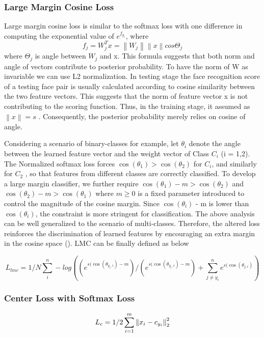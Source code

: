 \documentclass[a4paper,12pt, twoside]{NITKReport}
\begin{document}
\subsubsection{Large Margin Cosine Loss}
Large margin cosine loss is similar to the softmax loss with one difference in computing the exponential value of $e^{f_{y_{i}}}$, where 
\begin{equation}
{f_{j}}=W_{j}^{T} x = \left \| W_{j} \right \|\left \| x \right \|cos\Theta _{j}
\end{equation}
where $\Theta _{j}$ is angle between $W_{j}$ and x. This formula suggests that both norm and angle of vectors contribute to posterior probability. To have the norm of W as invariable we can use L2 normalization. In testing stage the face recognition score of a testing face pair is usually calculated according to cosine similarity between the two feature vectors.  This suggests that the norm of feature vector x is not  contributing to the scoring function.  Thus, in the training stage, it assumed as $\left \| x \right \| =s$ . Consequently, the posterior probability merely relies on cosine of angle.

Considering  a  scenario  of  binary-classes  for  example, let $\theta _{i}$ denote the angle between the learned feature vector and  the  weight  vector  of  Class $C_{i}$ (i = 1,2). The Normalized softmax loss forces $\cos(\theta_{1}) > \cos(\theta_{2})$ for $C_{i}$, and similarly  for $C_{2}$ , so that features from different classes are correctly classified. To develop a large margin classifier, we further require $\cos(\theta_{1}) - m > \cos(\theta_{2})$ and $\cos(\theta_{2}) - m > \cos(\theta_{1})$ where $m \geq 0$  is a fixed parameter introduced to control the magnitude of the cosine margin. Since $\cos(\theta_{i})$ - m is lower than $\cos(\theta_{i})$, the constraint is more stringent for classification. The above analysis can be well generalized to the scenario of multi-classes.  Therefore, the altered loss reinforces the
discrimination of learned features by encouraging an extra margin in the cosine space (\cite{DBLP:journals/corr/abs-1801-09414}). LMC can be finally defined as below

\begin{equation}
L_{lmc} = 1/N\sum_{i}^{n} -log((e^{s(\cos(\theta_{y_{i},i})-m})/
(e^{s(\cos(\theta_{y_{i},i})-m})+\sum_{j\neq y_{i}}^{n} e^{s(\cos(\theta_{j,i})})
\end{equation}


\subsubsection{Center Loss with Softmax Loss}
\begin{equation}
\centering
L_{c} = 1/2 \sum_{i=1}^{m}\left \| x{_{i}} - c_{y_{i}} \right \|_{2}^{2}
\end{equation}
\end{document}
